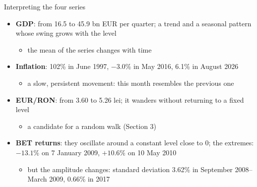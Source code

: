 \begin{frame}{Interpreting the four series}
\itemsize{\small}
\begin{itemize}
    \item \textbf{GDP}: from 16.5 to 45.9 bn EUR per quarter; a trend and a seasonal pattern whose swing grows with the level
    \begin{itemize}
        \item the mean of the series changes with time
    \end{itemize}
    \item \textbf{Inflation}: 102\% in June 1997, \ensuremath{-}3.0\% in May 2016, 6.1\% in August 2026
    \begin{itemize}
        \item a slow, persistent movement: this month resembles the previous one
    \end{itemize}
    \item \textbf{EUR/RON}: from 3.60 to 5.26 lei; it wanders without returning to a fixed level
    \begin{itemize}
        \item a candidate for a random walk (Section 3)
    \end{itemize}
    \item \textbf{BET returns}: they oscillate around a constant level close to 0; the extremes: $\ensuremath{-}13.1\%$ on 7 January 2009, $+10.6\%$ on 10 May 2010
    \begin{itemize}
        \item but the amplitude changes: standard deviation 3.62\% in September 2008--March 2009, 0.66\% in 2017
    \end{itemize}
\end{itemize}
\end{frame}

